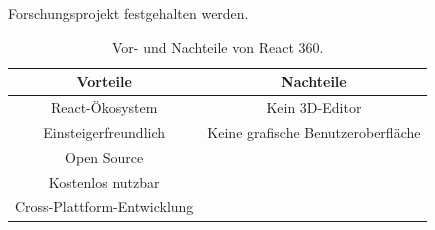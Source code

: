 \documentclass[a4paper,12pt,oneside]{article}
\begin{document}
        Forschungsprojekt festgehalten werden.
        \begin{table}[h]
          \begin{center}
            \begin{tabular}{| c | c |}
              \hline
              \textbf{Vorteile} & \textbf{Nachteile} \\ \hline
              React-Ökosystem & Kein 3D-Editor \\ \hline
              Einsteigerfreundlich & Keine grafische Benutzeroberfläche \\ \hline
              Open Source & \\ \hline
              Kostenlos nutzbar & \\ \hline
              Cross-Plattform-Entwicklung & \\
              \hline
            \end{tabular}
            \caption{Vor- und Nachteile von React 360.\label{tab:vor-und-nachteile-react}}
          \end{center}
        \end{table}
\end{document}
